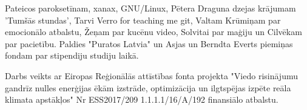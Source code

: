 Pateicos paroksetīnam, xanax, GNU/Linux, Pētera Draguna dzejas krājumam 'Tumšās stundas', Tarvi Verro for teaching me git, Valtam Krūmiņam par emocionālo atbalstu, Žeņam par kucēnu video, Solvitai par maģiju un Cilvēkam par pacietību. Paldies "Puratos Latvia" un Asjas un Berndta Everts piemiņas fondam par stipendiju studiju laikā.

Darbs veikts ar Eiropas Reģionālās attīstības fonta projekta "Viedo risinājumu gandrīz nulles enerģijas ēkām izstrāde, optimizācija un ilgtspējas izpēte reāla klimata apstākļos" Nr ESS2017/209 1.1.1.1/16/A/192 finansiālo atbalstu.
